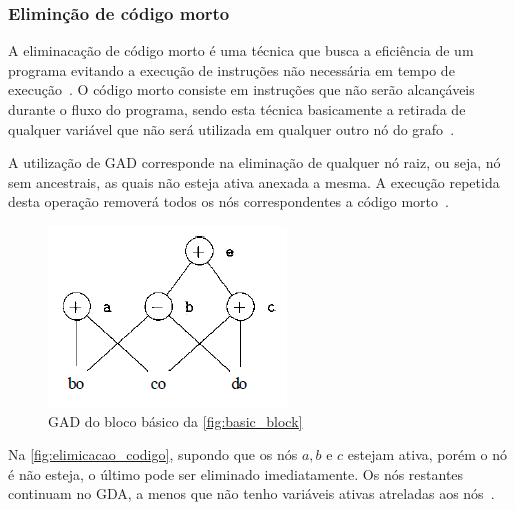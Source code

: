 

\subsubsection{Eliminção de código morto}

A eliminacação de código morto é uma técnica que busca a eficiência de um programa evitando a execução de instruções não necessária em tempo de execução~\cite{knoop1994partial}. O código morto consiste em instruções que não serão alcançáveis durante o fluxo do programa, sendo esta técnica basicamente a  retirada de qualquer variável que não será utilizada em qualquer outro nó do grafo~\cite{aho2007compilers}.

\par
A utilização de GAD corresponde na eliminação de qualquer nó raiz, ou seja, nó sem ancestrais, as quais não esteja ativa anexada a mesma. A execução repetida desta operação removerá todos os nós correspondentes a código morto~\cite{aho2007compilers}.

\begin{figure}[htb]
	\begin{center}
    \caption{\label{fig:elimicacao_codigo}GAD do bloco básico da \autoref{fig:basic_block}}
	\includegraphics[scale=0.70]{Figuras/eliminacao_codigo.png}
	\end{center}
\end{figure}

Na \autoref{fig:elimicacao_codigo}, supondo que os nós $a,b$ e $c$ estejam ativa, porém o nó é não esteja, o último pode ser eliminado imediatamente. Os nós restantes continuam no GDA, a menos que não tenho variáveis ativas atreladas aos nós~\cite{aho2007compilers}.


